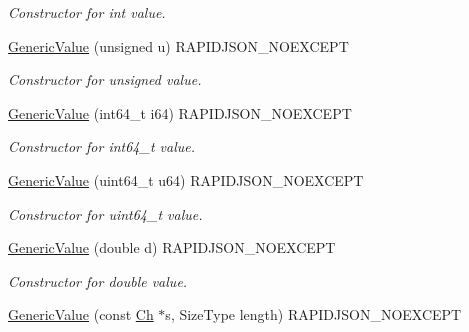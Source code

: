 \begin{DoxyCompactItemize}
\begin{DoxyCompactList}\small\item\em Constructor for int value. \end{DoxyCompactList}\item 
\mbox{\label{classGenericValue_a972bff6c56ac3d04622ff7fad8d98331}} 
\hyperlink{classGenericValue_a972bff6c56ac3d04622ff7fad8d98331}{Generic\+Value} (unsigned u) R\+A\+P\+I\+D\+J\+S\+O\+N\+\_\+\+N\+O\+E\+X\+C\+E\+PT
\begin{DoxyCompactList}\small\item\em Constructor for unsigned value. \end{DoxyCompactList}\item 
\mbox{\label{classGenericValue_a964b69f1d2596f75ded5421b6db01a14}} 
\hyperlink{classGenericValue_a964b69f1d2596f75ded5421b6db01a14}{Generic\+Value} (int64\+\_\+t i64) R\+A\+P\+I\+D\+J\+S\+O\+N\+\_\+\+N\+O\+E\+X\+C\+E\+PT
\begin{DoxyCompactList}\small\item\em Constructor for int64\+\_\+t value. \end{DoxyCompactList}\item 
\mbox{\label{classGenericValue_ad04805a57f5050c8e04be469ba64d6f3}} 
\hyperlink{classGenericValue_ad04805a57f5050c8e04be469ba64d6f3}{Generic\+Value} (uint64\+\_\+t u64) R\+A\+P\+I\+D\+J\+S\+O\+N\+\_\+\+N\+O\+E\+X\+C\+E\+PT
\begin{DoxyCompactList}\small\item\em Constructor for uint64\+\_\+t value. \end{DoxyCompactList}\item 
\mbox{\label{classGenericValue_a267d05b7e98c3507908eaf085fe41155}} 
\hyperlink{classGenericValue_a267d05b7e98c3507908eaf085fe41155}{Generic\+Value} (double d) R\+A\+P\+I\+D\+J\+S\+O\+N\+\_\+\+N\+O\+E\+X\+C\+E\+PT
\begin{DoxyCompactList}\small\item\em Constructor for double value. \end{DoxyCompactList}\item 
\mbox{\label{classGenericValue_a4d9af98141360cd801daab4ed1ca2c91}} 
\hyperlink{classGenericValue_a4d9af98141360cd801daab4ed1ca2c91}{Generic\+Value} (const \hyperlink{classGenericValue_ade0e0ce64ccd5d852da57a35e720bafb}{Ch} $\ast$s, Size\+Type length) R\+A\+P\+I\+D\+J\+S\+O\+N\+\_\+\+N\+O\+E\+X\+C\+E\+PT

\end{DoxyCompactItemize}
